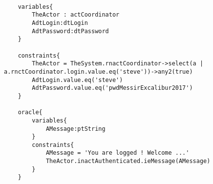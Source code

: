 	\scriptsize
	\vspace{0.5cm}
	\begin{lstlisting}[style=MessirStyle,firstnumber=auto,captionpos=b,caption={\msrmessir (MCL-oriented) specification of the test step \emph{testcase01-ts10oeLogin02}.},label=TM-testcase01-ts10oeLogin02-MCL-LST]

	variables{
		TheActor : actCoordinator
		AdtLogin:dtLogin
		AdtPassword:dtPassword
	}
	
	constraints{
		TheActor = TheSystem.rnactCoordinator->select(a | a.rnctCoordinator.login.value.eq('steve'))->any2(true)
		AdtLogin.value.eq('steve')
		AdtPassword.value.eq('pwdMessirExcalibur2017')
	}
	
	oracle{
		variables{
			AMessage:ptString
		}
		constraints{
			AMessage = 'You are logged ! Welcome ...'
			TheActor.inactAuthenticated.ieMessage(AMessage)
		}
	}
	
	\end{lstlisting}
	\normalsize 
	
	
